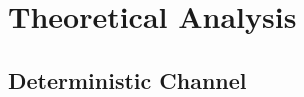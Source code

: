 \section{Theoretical Analysis} \label{sec:th_ana}

\subsection{Deterministic Channel} \label{ssec:stpa}

